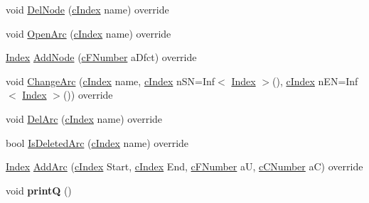 \begin{DoxyCompactItemize}
\item 
void \mbox{\hyperlink{class_m_c_f_cplex_a61b3f4c0ad2cc61162e944abd43ebd0d}{Del\+Node}} (\mbox{\hyperlink{class_m_c_f_class_a76aaabb20535c51a2752b93f6c38fe54}{c\+Index}} name) override
\item 
void \mbox{\hyperlink{class_m_c_f_cplex_af8adf5d3a1f9dfb9c2dd30c170663136}{Open\+Arc}} (\mbox{\hyperlink{class_m_c_f_class_a76aaabb20535c51a2752b93f6c38fe54}{c\+Index}} name) override
\item 
\mbox{\hyperlink{class_m_c_f_class_ad53d6229d7ec28555a9c9c2fd9abf773}{Index}} \mbox{\hyperlink{class_m_c_f_cplex_a3b1944c7daf09b4e72cc2eeda39e335d}{Add\+Node}} (\mbox{\hyperlink{class_m_c_f_class_a11f747fbdff346237c8db4469d569994}{c\+F\+Number}} a\+Dfct) override
\item 
void \mbox{\hyperlink{class_m_c_f_cplex_adbf1afd5cc24e1b5094f95945bd8e454}{Change\+Arc}} (\mbox{\hyperlink{class_m_c_f_class_a76aaabb20535c51a2752b93f6c38fe54}{c\+Index}} name, \mbox{\hyperlink{class_m_c_f_class_a76aaabb20535c51a2752b93f6c38fe54}{c\+Index}} n\+SN=Inf$<$ \mbox{\hyperlink{class_m_c_f_class_ad53d6229d7ec28555a9c9c2fd9abf773}{Index}} $>$(), \mbox{\hyperlink{class_m_c_f_class_a76aaabb20535c51a2752b93f6c38fe54}{c\+Index}} n\+EN=Inf$<$ \mbox{\hyperlink{class_m_c_f_class_ad53d6229d7ec28555a9c9c2fd9abf773}{Index}} $>$()) override
\item 
void \mbox{\hyperlink{class_m_c_f_cplex_a3b6145c95b83f40a76d724eb2b92f80f}{Del\+Arc}} (\mbox{\hyperlink{class_m_c_f_class_a76aaabb20535c51a2752b93f6c38fe54}{c\+Index}} name) override
\item 
bool \mbox{\hyperlink{class_m_c_f_cplex_a303cdd3554fa6aa53098d080262d1e4b}{Is\+Deleted\+Arc}} (\mbox{\hyperlink{class_m_c_f_class_a76aaabb20535c51a2752b93f6c38fe54}{c\+Index}} name) override
\item 
\mbox{\hyperlink{class_m_c_f_class_ad53d6229d7ec28555a9c9c2fd9abf773}{Index}} \mbox{\hyperlink{class_m_c_f_cplex_a57e7641179f820974444701d4f179fb6}{Add\+Arc}} (\mbox{\hyperlink{class_m_c_f_class_a76aaabb20535c51a2752b93f6c38fe54}{c\+Index}} Start, \mbox{\hyperlink{class_m_c_f_class_a76aaabb20535c51a2752b93f6c38fe54}{c\+Index}} End, \mbox{\hyperlink{class_m_c_f_class_a11f747fbdff346237c8db4469d569994}{c\+F\+Number}} aU, \mbox{\hyperlink{class_m_c_f_class_a07dbefeeb08c3f63073622411893eb76}{c\+C\+Number}} aC) override
\item 
\mbox{\label{class_m_c_f_cplex_a16483a95159d988fa93bda427122bc0d}} 
void {\bfseries printQ} ()

\end{DoxyCompactItemize}
